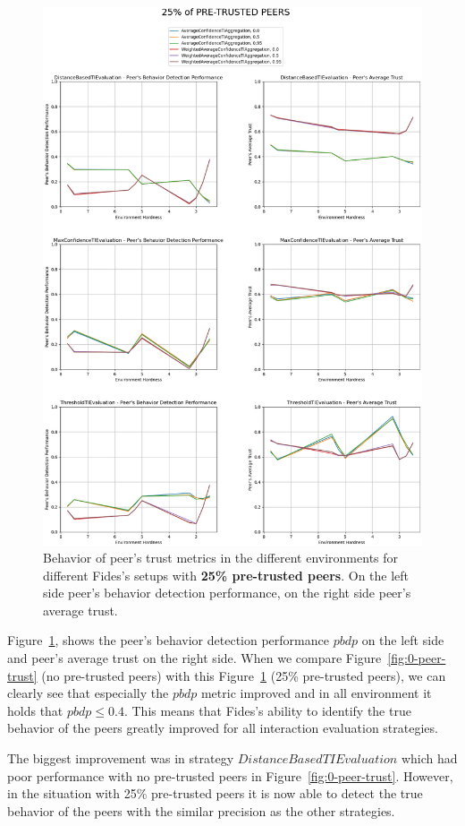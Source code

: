 \begin{figure}[hp]
    \centering
    \includegraphics[width=1.0\textwidth]{assets/25_peer_trust.png}
    \caption{Behavior of peer's trust metrics in the different environments for different Fides's setups with \textbf{25\% pre-trusted peers}. On the left side peer's behavior detection performance, on the right side peer's average trust.}
    \label{fig:25-peer-trust}
\end{figure}

Figure~\ref{fig:25-peer-trust}, shows the peer's behavior detection performance $pbdp$ on the left side and peer's average trust on the right side.
When we compare Figure~\ref{fig:0-peer-trust} (no pre-trusted peers) with this Figure~\ref{fig:25-peer-trust} (25\% pre-trusted peers), we can clearly see that especially the $pbdp$ metric improved and in all environment it holds that $pbdp \leq 0.4$. 
This means that Fides's ability to identify the true behavior of the peers greatly improved for all interaction evaluation strategies.

The biggest improvement was in strategy $DistanceBasedTIEvaluation$ which had poor performance with no pre-trusted peers in Figure~\ref{fig:0-peer-trust}. However, in the situation with 25\% pre-trusted peers it is now able to detect the true behavior of the peers with the similar precision as the other strategies.
